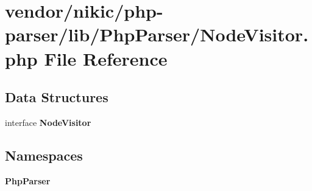 \section{vendor/nikic/php-\/parser/lib/\+Php\+Parser/\+Node\+Visitor.php File Reference}
\label{_node_visitor_8php}
\subsection*{Data Structures}
\begin{DoxyCompactItemize}
\item 
interface {\bf Node\+Visitor}
\end{DoxyCompactItemize}
\subsection*{Namespaces}
\begin{DoxyCompactItemize}
\item 
 {\bf Php\+Parser}
\end{DoxyCompactItemize}
